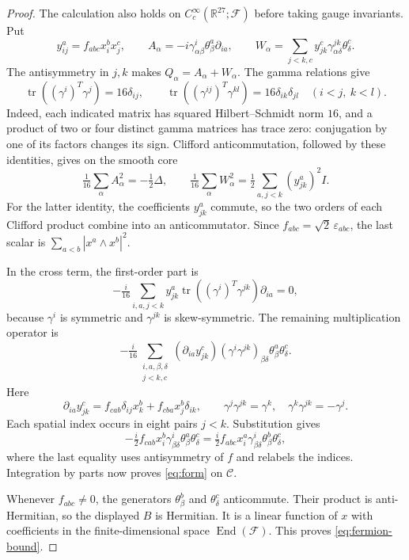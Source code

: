 \documentclass[11pt]{amsart}
\newcommand{\R}{\mathbb R}
\newcommand{\F}{\mathcal F}
\newcommand{\Core}{\mathcal C}
\newcommand{\tr}{\operatorname{tr}}
\theoremstyle{remark}
\numberwithin{equation}{section}
\begin{document}
\begin{proof}
The calculation also holds on $C_c^\infty(\R^{27};\F)$ before taking
gauge invariants. Put
\[
 y^a_{ij}=f_{abc}x_i^b x_j^c,\qquad
 A_\alpha=-i\gamma^i_{\alpha\beta}\theta_\beta^a\partial_{ia},
 \qquad
 W_\alpha=\sum_{j<k,c}y^c_{jk}\gamma^{jk}_{\alpha\delta}\theta_\delta^c.
\]
The antisymmetry in $j,k$ makes $Q_\alpha=A_\alpha+W_\alpha$.
The gamma relations give
\[
 \tr((\gamma^i)^T\gamma^j)=16\delta_{ij},\qquad
 \tr((\gamma^{ij})^T\gamma^{kl})
   =16\delta_{ik}\delta_{jl}\quad(i<j,\ k<l).
\]
Indeed, each indicated matrix has squared Hilbert--Schmidt norm $16$,
and a product of two or four distinct gamma matrices has trace zero:
conjugation by one of its factors changes its sign. Clifford
anticommutation, followed by these identities, gives on the smooth core
\[
 \tfrac1{16}\sum_\alpha A_\alpha^2=-\tfrac12\Delta,\qquad
 \tfrac1{16}\sum_\alpha W_\alpha^2
    =\tfrac12\sum_{a,j<k}(y^a_{jk})^2I.
\]
For the latter identity, the coefficients $y^a_{jk}$ commute, so the
two orders of each Clifford product combine into an anticommutator.
Since $f_{abc}=\sqrt2\,\varepsilon_{abc}$, the last scalar is
$\sum_{a<b}|x^a\wedge x^b|^2$.

In the cross term, the first-order part is
\[
 -\tfrac i{16}\sum_{i,a,j<k}
 y^a_{jk}\tr((\gamma^i)^T\gamma^{jk})\partial_{ia}=0,
\]
because $\gamma^i$ is symmetric and $\gamma^{jk}$ is skew-symmetric.
The remaining multiplication operator is
\[
 -\tfrac i{16}\sum_{\substack{i,a,\beta,\delta\\j<k,c}}
   (\partial_{ia}y^c_{jk})
   (\gamma^i\gamma^{jk})_{\beta\delta}
   \theta_\beta^a\theta_\delta^c.
\]
Here
\[
 \partial_{ia}y^c_{jk}
 =f_{cab}\delta_{ij}x_k^b+f_{cba}x_j^b\delta_{ik},
 \qquad
 \gamma^j\gamma^{jk}=\gamma^k,\quad
 \gamma^k\gamma^{jk}=-\gamma^j.
\]
Each spatial index occurs in eight pairs $j<k$. Substitution gives
\[
 -\tfrac i2 f_{cab}x_i^b\gamma^i_{\beta\delta}
                   \theta_\beta^a\theta_\delta^c
 =\tfrac i2 f_{abc}x_i^a\gamma^i_{\beta\delta}
                   \theta_\beta^b\theta_\delta^c,
\]
where the last equality uses antisymmetry of $f$ and relabels the
indices. Integration by parts now proves \eqref{eq:form} on $\Core$.

Whenever $f_{abc}\ne0$, the generators
$\theta_\beta^b$ and $\theta_\delta^c$ anticommute. Their product is
anti-Hermitian, so the displayed $B$ is Hermitian. It is a linear
function of $x$ with coefficients in the finite-dimensional space
$\operatorname{End}(\F)$. This proves \eqref{eq:fermion-bound}.
\end{proof}
\end{document}
